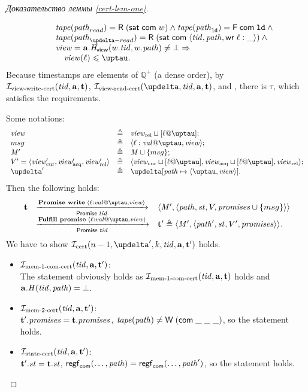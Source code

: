 \begin{proof}[Доказательство леммы \ref{cert-lem-one}]
\begin{itemize}
\[\begin{array}{l l}
           & \quad \tape(\cpath_{read}) = \tapeRead{(\tapeSatisfied{\Committed}{\w})} \land
             \tape(\cpath_{\LD}) = \tapeFence{\Committed}{\LD} \land {} \\
           & \quad \tape(\cpath_{\delta-read}) = \tapeRead{(\tapeSatisfied{\Committed}{\stRequestWrite{\tId}{\cpath}\loc}{\_})} \land {} \\
           & \quad \R = \aT.\rmap(\w.\tId, \w.\cpath) \not = \bot \Rightarrow \\
           & \quad \quad \R(\loc) \le \tau. \\
      \end{array}\]
      Because timestamps are elements of $\mathbb{Q}^{+}$ (a dense order), by $\mathcal{I}_{\textup{\rm view-write-cert}}(\mathit{tid}, \mathbf{a}, \mathbf{t})$,
      $\invViewReadCERT(\delta, \tId, \aT, \tT)$, and \app{\ref{thm:invAview}}, there is $\tau$, which satisfies the requirements.

      Some notations:
      \[\begin{array}{l l l}
        \R  & \triangleq & \Rrel \sqcup [\loc @ \tau]; \\
        msg & \triangleq & \writeEvt{\loc}{\stval}{\tau}{\R}; \\
        \Mprom' & \triangleq & \Mprom \cup \{msg\};\\
        \V' = \angled{\Rcur', \Racq', \Rrel'} & \triangleq & \angled{\Rcur \sqcup [\loc @ \tau], \Racq \sqcup [\loc @ \tau], \Rrel}; \\
        \delta' & \triangleq & \delta[\cpath \mapsto \angled{\tau, \R}].\\ 
      \end{array}\]
      Then the following holds:
      \[\begin{array}{l l l}
        \tT & \promTStepPromiseLoc & \angled{\Mprom', \angled{\cpath , \PromState, \V, \PromSet \cup \{msg\}}} \\
            & \promTStepFulfillLoc & \tT' \triangleq \angled{\Mprom', \angled{\cpath', \PromState, \V', \PromSet}}. \\
      \end{array}\]
      We have to show $\invCert(n - 1, \delta', k, \tId, \aT, \tT')$ holds.
      
      \begin{itemize}
        \item $\mathcal{I}_{\textup{\rm mem-1-com-cert}}(\mathit{tid}, \mathbf{a}, \mathbf{t}')$: \\
          The statement obviously holds as $\mathcal{I}_{\textup{\rm mem-1-com-cert}}(\mathit{tid}, \mathbf{a}, \mathbf{t})$ holds and $\mathbf{a}.\mathit{H}(\mathit{tid}, \mathit{path}) = \bot$.
        \item $\mathcal{I}_{\textup{\rm mem-2-cert}}(\mathit{tid}, \mathbf{a}, \mathbf{t}')$: \\
          $\mathbf{t}'.\mathit{promises} = \mathbf{t}.\mathit{promises}$, $\mathit{tape}(\mathit{path}) \not = \textsf{W} \; (\mathsf{com} \; \_ \; \_ \; \_)$,
          so the statement holds.
        \item $\mathcal{I}_{\textup{\rm state-cert}}(\mathit{tid}, \mathbf{a}, \mathbf{t}')$: \\
          $\mathbf{t}'.\mathit{st} = \mathbf{t}.\mathit{st}$, $\mathsf{regf}_\mathsf{com}(\dots, \mathit{path}) = \mathsf{regf}_\mathsf{com}(\dots, \mathit{path}')$, so the statement holds.


\end{itemize}
\end{itemize}
\end{proof}
